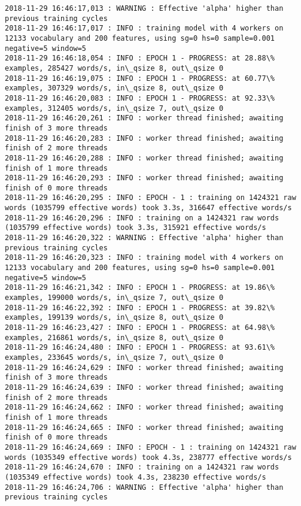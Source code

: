 \documentclass[11pt]{article}
\begin{document}
\begin{Verbatim}[commandchars=\\\{\}]
2018-11-29 16:46:17,013 : WARNING : Effective 'alpha' higher than previous training cycles
2018-11-29 16:46:17,017 : INFO : training model with 4 workers on 12133 vocabulary and 200 features, using sg=0 hs=0 sample=0.001 negative=5 window=5
2018-11-29 16:46:18,054 : INFO : EPOCH 1 - PROGRESS: at 28.88\% examples, 285427 words/s, in\_qsize 8, out\_qsize 0
2018-11-29 16:46:19,075 : INFO : EPOCH 1 - PROGRESS: at 60.77\% examples, 307329 words/s, in\_qsize 8, out\_qsize 0
2018-11-29 16:46:20,083 : INFO : EPOCH 1 - PROGRESS: at 92.33\% examples, 312405 words/s, in\_qsize 7, out\_qsize 0
2018-11-29 16:46:20,261 : INFO : worker thread finished; awaiting finish of 3 more threads
2018-11-29 16:46:20,283 : INFO : worker thread finished; awaiting finish of 2 more threads
2018-11-29 16:46:20,288 : INFO : worker thread finished; awaiting finish of 1 more threads
2018-11-29 16:46:20,293 : INFO : worker thread finished; awaiting finish of 0 more threads
2018-11-29 16:46:20,295 : INFO : EPOCH - 1 : training on 1424321 raw words (1035799 effective words) took 3.3s, 316647 effective words/s
2018-11-29 16:46:20,296 : INFO : training on a 1424321 raw words (1035799 effective words) took 3.3s, 315921 effective words/s
2018-11-29 16:46:20,322 : WARNING : Effective 'alpha' higher than previous training cycles
2018-11-29 16:46:20,323 : INFO : training model with 4 workers on 12133 vocabulary and 200 features, using sg=0 hs=0 sample=0.001 negative=5 window=5
2018-11-29 16:46:21,342 : INFO : EPOCH 1 - PROGRESS: at 19.86\% examples, 199000 words/s, in\_qsize 7, out\_qsize 0
2018-11-29 16:46:22,392 : INFO : EPOCH 1 - PROGRESS: at 39.82\% examples, 199139 words/s, in\_qsize 8, out\_qsize 0
2018-11-29 16:46:23,427 : INFO : EPOCH 1 - PROGRESS: at 64.98\% examples, 216861 words/s, in\_qsize 8, out\_qsize 0
2018-11-29 16:46:24,480 : INFO : EPOCH 1 - PROGRESS: at 93.61\% examples, 233645 words/s, in\_qsize 7, out\_qsize 0
2018-11-29 16:46:24,629 : INFO : worker thread finished; awaiting finish of 3 more threads
2018-11-29 16:46:24,639 : INFO : worker thread finished; awaiting finish of 2 more threads
2018-11-29 16:46:24,662 : INFO : worker thread finished; awaiting finish of 1 more threads
2018-11-29 16:46:24,665 : INFO : worker thread finished; awaiting finish of 0 more threads
2018-11-29 16:46:24,669 : INFO : EPOCH - 1 : training on 1424321 raw words (1035349 effective words) took 4.3s, 238777 effective words/s
2018-11-29 16:46:24,670 : INFO : training on a 1424321 raw words (1035349 effective words) took 4.3s, 238230 effective words/s
2018-11-29 16:46:24,706 : WARNING : Effective 'alpha' higher than previous training cycles

\end{Verbatim}
\end{document}
